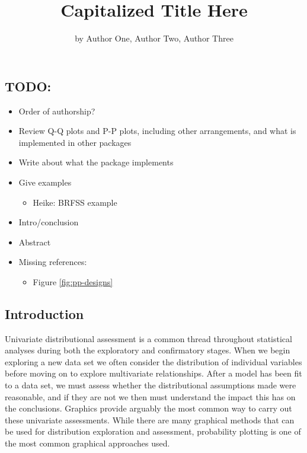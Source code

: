\title{Capitalized Title Here}
\author{by Author One, Author Two, Author Three}

\maketitle


\subsection{TODO:}\label{todo}

\begin{itemize}
\tightlist
\item
  Order of authorship?
\item
  Review Q-Q plots and P-P plots, including other arrangements, and what
  is implemented in other packages
\item
  Write about what the package implements
\item
  Give examples

  \begin{itemize}
  \tightlist
  \item
    Heike: BRFSS example
  \end{itemize}
\item
  Intro/conclusion
\item
  Abstract
\item
  Missing references:

  \begin{itemize}
  \tightlist
  \item
    Figure \ref{fig:pp-designs}
  \end{itemize}
\end{itemize}

\subsection{Introduction}\label{introduction}

\label{sec:introduction}

Univariate distributional assessment is a common thread throughout
statistical analyses during both the exploratory and confirmatory
stages. When we begin exploring a new data set we often consider the
distribution of individual variables before moving on to explore
multivariate relationships. After a model has been fit to a data set, we
must assess whether the distributional assumptions made were reasonable,
and if they are not we then must understand the impact this has on the
conclusions. Graphics provide arguably the most common way to carry out
these univariate assessments. While there are many graphical methods
that can be used for distribution exploration and assessment,
probability plotting is one of the most common graphical approaches
used.

